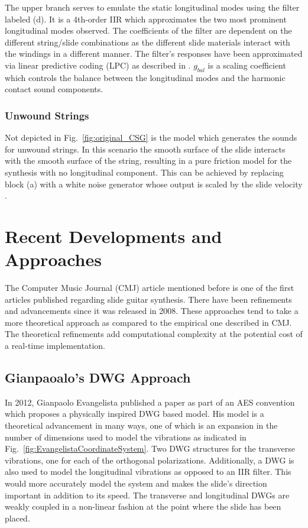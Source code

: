 \documentclass[main.tex]{subfiles}
\begin{document}
The upper branch serves to emulate the static longitudinal modes using the filter labeled (d). It is a 4th-order IIR which approximates the two most prominent longitudinal modes observed. The coefficients of the filter are dependent on the different string/slide combinations as the different slide materials interact with the windings in a different manner. The filter's responses have been approximated via linear predictive coding (LPC) as described in . $g_{bal}$ is a scaling coefficient which controls the balance between the longitudinal modes and the harmonic contact sound components.

\subsubsection{Unwound Strings}
Not depicted in Fig.~\ref{fig:original_CSG} is the model which generates the sounds for unwound strings. In this scenario the smooth surface of the slide interacts with the smooth surface of the string, resulting in a pure friction model for the synthesis with no longitudinal component. This can be achieved by replacing block (a) with a white noise generator whose output is scaled by the slide velocity .

\section{Recent Developments and Approaches}
The Computer Music Journal (CMJ) article mentioned before is one of the first articles published regarding slide guitar synthesis. There have been refinements and advancements since it was released in 2008. These approaches tend to take a more theoretical approach as compared to the empirical one described in CMJ. The theoretical refinements add computational complexity at the potential cost of a real-time implementation.

\subsection{Gianpaoalo's DWG Approach}
In 2012, Gianpaolo Evangelista published a paper as part of an AES convention which proposes a physically inspired DWG based model. His model is a theoretical advancement in many ways, one of which is an expansion in the number of dimensions used to model the vibrations as indicated in Fig.~\ref{fig:EvangelistaCoordinateSystem}. Two DWG structures for the transverse vibrations, one for each of the orthogonal polarizations. Additionally, a DWG is also used to model the longitudinal vibrations as opposed to an IIR filter. This would more accurately model the system and makes the slide's direction important in addition to its speed. The transverse and longitudinal DWGs are weakly coupled in a non-linear fashion at the point where the slide has been placed.
\end{document}
